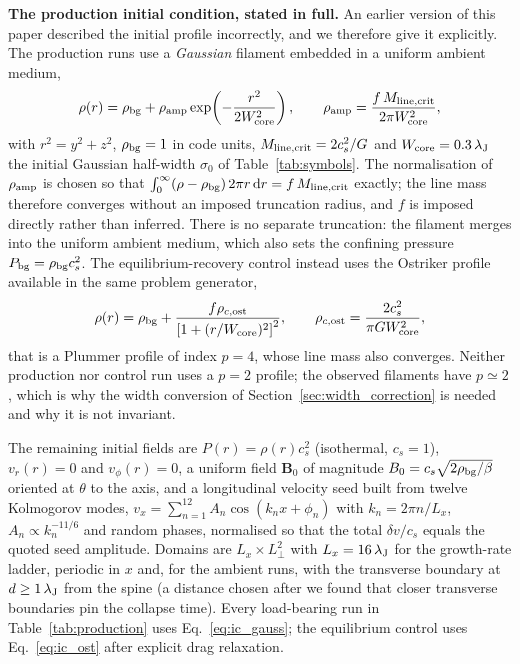 \documentclass[usenatbib,twoside,twocolumn]{mnras}
\begin{document}
\smallskip\noindent\textbf{The production initial condition, stated in full.} An earlier version of this paper described the initial profile incorrectly, and we therefore give it explicitly. The production runs use a \emph{Gaussian} filament embedded in a uniform ambient medium,
\begin{equation}
\rho(r)=\rho_{\rm bg}+\rho_{\rm amp}\exp\!\left(-\frac{r^{2}}{2W_{\rm core}^{2}}\right),\qquad
\rho_{\rm amp}=\frac{f\,M_{\rm line,crit}}{2\pi W_{\rm core}^{2}},
\label{eq:ic_gauss}
\end{equation}
with $r^{2}=y^{2}+z^{2}$, $\rho_{\rm bg}=1$ in code units, $M_{\rm line,crit}=2c_s^{2}/G$ and $W_{\rm core}=0.3\,\lambda_{\rm J}$ the initial Gaussian half-width $\sigma_0$ of Table~\ref{tab:symbols}. The normalisation of $\rho_{\rm amp}$ is chosen so that $\int_0^\infty(\rho-\rho_{\rm bg})\,2\pi r\,{\rm d}r=f\,M_{\rm line,crit}$ exactly; the line mass therefore converges without an imposed truncation radius, and $f$ is imposed directly rather than inferred. There is no separate truncation: the filament merges into the uniform ambient medium, which also sets the confining pressure $P_{\rm bg}=\rho_{\rm bg}c_s^{2}$. The equilibrium-recovery control instead uses the Ostriker profile available in the same problem generator,
\begin{equation}
\rho(r)=\rho_{\rm bg}+\frac{f\rho_{c,\rm ost}}{\left[1+(r/W_{\rm core})^{2}\right]^{2}},\qquad
\rho_{c,\rm ost}=\frac{2c_s^{2}}{\pi G W_{\rm core}^{2}},
\label{eq:ic_ost}
\end{equation}
that is a Plummer profile of index $p=4$, whose line mass also converges. Neither production nor control run uses a $p=2$ profile; the observed filaments have $p\simeq2$, which is why the width conversion of Section~\ref{sec:width_correction} is needed and why it is not invariant.

The remaining initial fields are $P(r)=\rho(r)c_s^{2}$ (isothermal, $c_s=1$), $v_r(r)=0$ and $v_\phi(r)=0$, a uniform field $\mathbf{B}_0$ of magnitude $B_0=c_s\sqrt{2\rho_{\rm bg}/\beta}$ oriented at $\theta$ to the axis, and a longitudinal velocity seed built from twelve Kolmogorov modes, $v_x=\sum_{n=1}^{12}A_n\cos(k_nx+\phi_n)$ with $k_n=2\pi n/L_x$, $A_n\propto k_n^{-11/6}$ and random phases, normalised so that the total $\delta v/c_s$ equals the quoted seed amplitude. Domains are $L_x\times L_\perp^{2}$ with $L_x=16\,\lambda_{\rm J}$ for the growth-rate ladder, periodic in $x$ and, for the ambient runs, with the transverse boundary at $d\geq1\,\lambda_{\rm J}$ from the spine (a distance chosen after we found that closer transverse boundaries pin the collapse time). Every load-bearing run in Table~\ref{tab:production} uses Eq.~\ref{eq:ic_gauss}; the equilibrium control uses Eq.~\ref{eq:ic_ost} after explicit drag relaxation.
\end{document}
